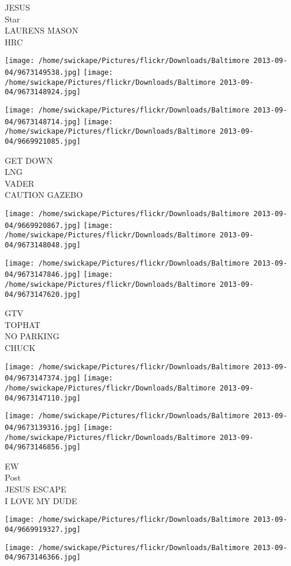 \documentclass[10pt,letterpaper]{article}
\begin{document}
JESUS\\
Star\\
LAURENS MASON\\
HRC
\pagebreak

\texttt{[image: /home/swickape/Pictures/flickr/Downloads/Baltimore 2013-09-04/9673149538.jpg]}
\texttt{[image: /home/swickape/Pictures/flickr/Downloads/Baltimore 2013-09-04/9673148924.jpg]}

\texttt{[image: /home/swickape/Pictures/flickr/Downloads/Baltimore 2013-09-04/9673148714.jpg]}
\texttt{[image: /home/swickape/Pictures/flickr/Downloads/Baltimore 2013-09-04/9669921085.jpg]}

GET DOWN\\
LNG\\
VADER\\
CAUTION GAZEBO
\pagebreak

\texttt{[image: /home/swickape/Pictures/flickr/Downloads/Baltimore 2013-09-04/9669920867.jpg]}
\texttt{[image: /home/swickape/Pictures/flickr/Downloads/Baltimore 2013-09-04/9673148048.jpg]}

\texttt{[image: /home/swickape/Pictures/flickr/Downloads/Baltimore 2013-09-04/9673147846.jpg]}
\texttt{[image: /home/swickape/Pictures/flickr/Downloads/Baltimore 2013-09-04/9673147620.jpg]}

GTV\\
TOPHAT\\
NO PARKING\\
CHUCK
\pagebreak

\texttt{[image: /home/swickape/Pictures/flickr/Downloads/Baltimore 2013-09-04/9673147374.jpg]}
\texttt{[image: /home/swickape/Pictures/flickr/Downloads/Baltimore 2013-09-04/9673147110.jpg]}

\texttt{[image: /home/swickape/Pictures/flickr/Downloads/Baltimore 2013-09-04/9673139316.jpg]}
\texttt{[image: /home/swickape/Pictures/flickr/Downloads/Baltimore 2013-09-04/9673146856.jpg]}

EW\\
Post\\
JESUS ESCAPE\\
I LOVE MY DUDE
\pagebreak

\texttt{[image: /home/swickape/Pictures/flickr/Downloads/Baltimore 2013-09-04/9669919327.jpg]}

\vspace{0.25in}
\texttt{[image: /home/swickape/Pictures/flickr/Downloads/Baltimore 2013-09-04/9673146366.jpg]}
\end{document}

